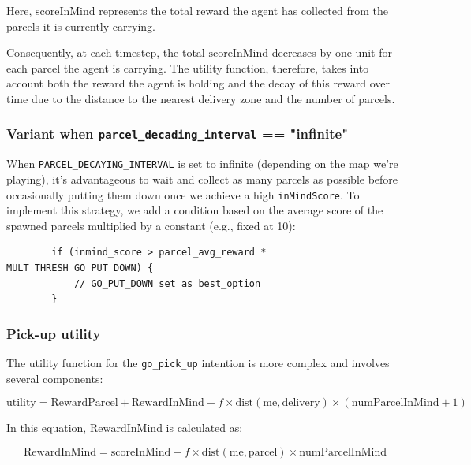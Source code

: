 \documentclass[12pt]{article}
\begin{document}
Here, $\text{scoreInMind}$ represents the total reward the agent has collected from the parcels it is currently carrying. 


Consequently, at each timestep, the total $\text{scoreInMind}$ decreases by one unit for each parcel the agent is carrying. The utility function, therefore, takes into account both the reward the agent is holding and the decay of this reward over time due to the distance to the nearest delivery zone and the number of parcels.

\subsubsection{Variant when \texttt{parcel\_decading\_interval} == "infinite"}

\label{variant_go_put_down}

When \texttt{PARCEL\_DECAYING\_INTERVAL} is set to infinite (depending on the map we're playing), it's advantageous to wait and collect as many parcels as possible before occasionally putting them down once we achieve a high \texttt{inMindScore}. To implement this strategy, we add a condition based on the average score of the spawned parcels multiplied by a constant (e.g., fixed at 10):

\begin{verbatim}
        if (inmind_score > parcel_avg_reward * MULT_THRESH_GO_PUT_DOWN) {
            // GO_PUT_DOWN set as best_option
        }
\end{verbatim}

\subsubsection{Pick-up utility}

The utility function for the \texttt{go\_pick\_up} intention is more complex and involves several components:

\begin{equation}
    \text{utility} = \text{RewardParcel} + \text{RewardInMind} - f \times \text{dist}(\text{me}, \text{delivery}) \times (\text{numParcelInMind} + 1)
\end{equation}

In this equation, $\text{RewardInMind}$ is calculated as:

\begin{equation}
    \text{RewardInMind} = \text{scoreInMind} - f \times \text{dist}(\text{me}, \text{parcel}) \times \text{numParcelInMind}
\end{equation}
\end{document}
